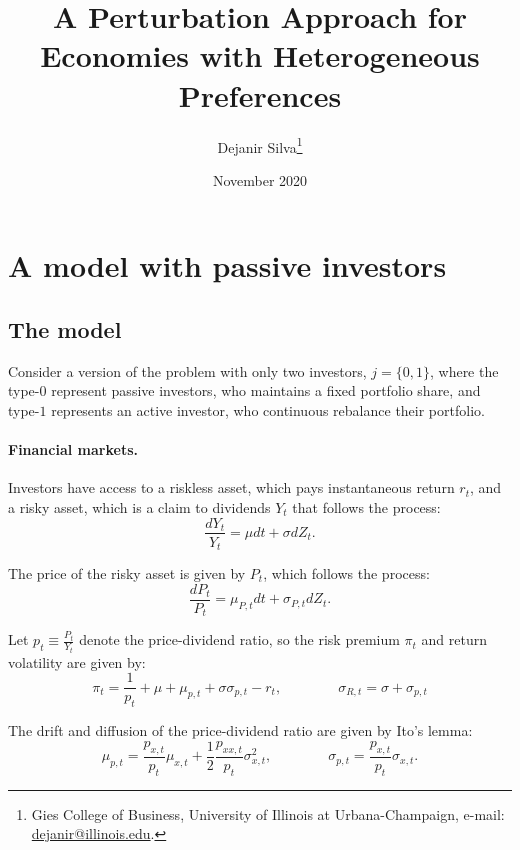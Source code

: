 \documentclass[11pt,english]{article}
\title{\textbf{A Perturbation Approach for Economies with Heterogeneous Preferences}}
\author{ Dejanir Silva\thanks{Gies College of Business, University of Illinois at Urbana-Champaign, e-mail: \href{dejanir@illinois.edu}{dejanir@illinois.edu}.}}
\date{November 2020}
\begin{document}
\onehalfspacing	

\section{A model with passive investors}

\subsection{The model}

Consider a version of the problem with only two investors, $j = \{0,1\}$, where the type-$0$ represent passive investors, who maintains a fixed portfolio share, and type-$1$ represents an active investor, who continuous rebalance their portfolio.

\paragraph{Financial markets.} Investors have access to a riskless asset, which pays instantaneous return $r_t$, and a risky asset, which is a claim to dividends $Y_t$ that follows the process:
\begin{equation}
    \frac{d Y_t}{Y_t} = \mu dt + \sigma d Z_t.
\end{equation}

The price of the risky asset is given by $P_t$, which follows the process:
\begin{equation}
    \frac{d P_{t}}{P_t} = \mu_{P,t} dt + \sigma_{P,t} dZ_t.
\end{equation}

Let $p_t \equiv \frac{P_t}{Y_t}$ denote the price-dividend ratio, so the risk premium $\pi_t$ and return volatility are given by:
\begin{equation}
    \pi_t = \frac{1}{p_t} + \mu+\mu_{p,t} + \sigma \sigma_{p,t}  - r_t, \qquad \qquad
    \sigma_{R,t} = \sigma +\sigma_{p,t}
\end{equation}

The drift and diffusion of the price-dividend ratio are given by Ito's lemma:
\begin{equation}
    \mu_{p,t} =  \frac{p_{x,t}}{p_t} \mu_{x,t}+\frac{1}{2} \frac{p_{xx,t}}{p_t} \sigma_{x,t}^2, \qquad \qquad
    \sigma_{p,t} = \frac{p_{x,t}}{p_t} \sigma_{x,t}.
\end{equation}
\end{document}

